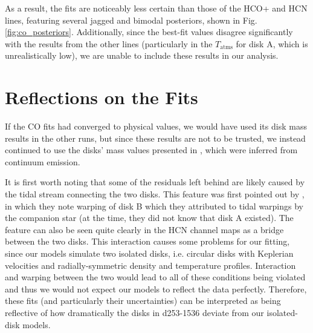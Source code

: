 




As a result, the fits are noticeably less certain than those of the HCO+ and HCN lines, featuring several jagged and bimodal posteriors, shown in Fig. \ref{fig:co_posteriors}. Additionally, since the best-fit values disagree significantly with the results from the other lines (particularly in the $T_\text{atms}$ for disk A, which is unrealistically low), we are unable to include these results in our analysis.







\section{Reflections on the Fits}

If the CO fits had converged to physical values, we would have used its disk mass results in the other runs, but since these results are not to be trusted, we instead continued to use the disks' mass values presented in \citet{Williams2014}, which were inferred from continuum emission.

It is first worth noting that some of the residuals left behind are likely caused by the tidal stream connecting the two disks. This feature was first pointed out by \citet{Smith2005}, in which they note warping of disk B which they attributed to tidal warpings by the companion star (at the time, they did not know that disk A existed). The feature can also be seen quite clearly in the HCN channel maps as a bridge between the two disks. This interaction causes some problems for our fitting, since our models simulate two isolated disks, i.e. circular disks with Keplerian velocities and radially-symmetric density and temperature profiles. Interaction and warping between the two would lead to all of these conditions being violated and thus we would not expect our models to reflect the data perfectly. Therefore, these fits (and particularly their uncertainties) can be interpreted as being reflective of how dramatically the disks in d253-1536 deviate from our isolated-disk models.


